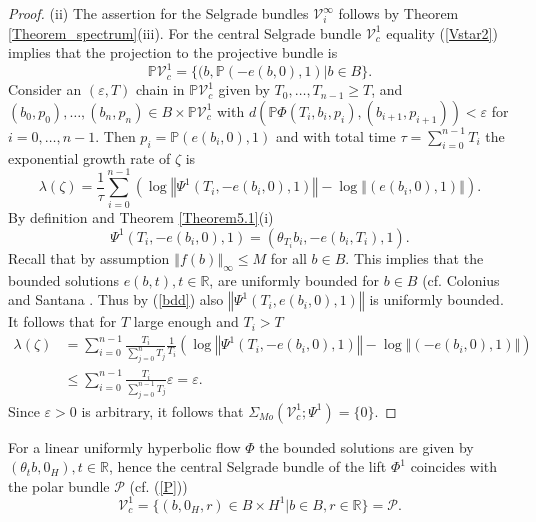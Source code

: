 \begin{proof}
		(ii) The assertion for the Selgrade bundles $\mathcal{V}_{i}^{\infty}$ follows
		by Theorem \ref{Theorem_spectrum}(iii). For the central Selgrade bundle
		$\mathcal{V}_{c}^{1}$ equality (\ref{Vstar2}) implies that the projection to
		the projective bundle is%
		\[
		\mathbb{P}\mathcal{V}_{c}^{1}=\{(b,\mathbb{P}(-e(b,0),1)\left\vert b\in
		B\right.  \}.
		\]
		Consider an $(\varepsilon,T)$ chain in $\mathbb{P}\mathcal{V}_{c}^{1}$ given
		by $T_{0},\ldots,T_{n-1}\geq T$, and $(b_{0},p_{0}),\ldots,\allowbreak
		(b_{n},p_{n})\in B\times\mathbb{P}\mathcal{V}_{c}^{1}$ with $d(\mathbb{P}%
		\Phi(T_{i},b_{i},p_{i}),(b_{i+1},p_{i+1}))<\varepsilon$ for $i=0,\ldots,n-1.$
		Then $p_{i}=\mathbb{P}(e(b_{i},0),1)$ and with total time $\tau=\sum
		_{i=0}^{n-1}T_{i}$ the exponential growth rate of $\zeta$ is
		\[
		\lambda(\zeta)=\frac{1}{\tau}\sum_{i=0}^{n-1}\left(  \log\left\Vert \Psi
		^{1}(T_{i},-e(b_{i},0),1)\right\Vert -\log\left\Vert (e(b_{i},0),1)\right\Vert
		\right)  .
		\]
		By definition and Theorem \ref{Theorem5.1}(i)%
		\begin{equation}
			\Psi^{1}(T_{i},-e(b_{i},0),1)=(\theta_{T_{i}}b_{i},-e(b_{i},T_{i}),1).
			\label{bdd}%
		\end{equation}
		Recall that by assumption $\left\Vert f(b)\right\Vert _{\infty}\leq M$ for all
		$b\in B$. This implies that the bounded solutions $e(b,t),t\in\mathbb{R}$, are
		uniformly bounded for $b\in B$ (cf. Colonius and Santana \cite[formula (13)
		and Corollary 1]{ColSan11}. Thus by (\ref{bdd}) also $\left\Vert \Psi
		^{1}(T_{i},e(b_{i},0),1)\right\Vert $ is uniformly bounded. It follows that
		for $T$ large enough and $T_{i}>T$%
		\begin{align*}
			\lambda(\zeta)  &  =\sum_{i=0}^{n-1}\frac{T_{i}}{\sum_{j=0}^{n}T_{j}}\frac
			{1}{T_{i}}\left(  \log\left\Vert \Psi^{1}(T_{i},-e(b_{i},0),1)\right\Vert
			-\log\left\Vert (-e(b_{i},0),1)\right\Vert \right) \\
			&  \leq\sum_{i=0}^{n-1}\frac{T_{i}}{\sum_{j=0}^{n-1}T_{j}}\varepsilon
			=\varepsilon.
		\end{align*}
		Since $\varepsilon>0$ is arbitrary, it follows that $\Sigma_{Mo}%
		(\mathcal{V}_{c}^{1};\Psi^{1})=\{0\}$.
	\end{proof}
	
	\begin{remark}
		For a linear uniformly hyperbolic flow $\Phi$ the bounded solutions are given
		by $(\theta_{t}b,0_{H}),t\in\mathbb{R}$, hence the central Selgrade bundle of
		the lift $\Phi^{1}$ coincides with the polar bundle $\mathcal{P}$ (cf.
		(\ref{P}))
		\[
		\mathcal{V}_{c}^{1}=\{(b,0_{H},r)\in B\times H^{1}\left\vert b\in
		B,r\in\mathbb{R}\right.  \}=\mathcal{P}.
		\]
		
	\end{remark}
	
